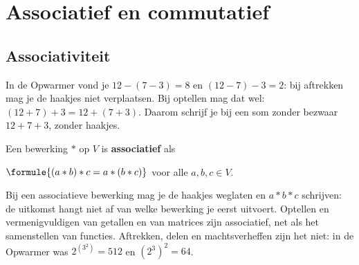 \begin{oefeningen}
\end{oefeningen}

\section{Associatief en commutatief}

\subsection{Associativiteit}

In de Opwarmer vond je $12 - (7 - 3) = 8$ en $(12 - 7) - 3 = 2$: bij aftrekken mag je de haakjes niet verplaatsen. Bij optellen mag dat wel: $(12 + 7) + 3 = 12 + (7 + 3)$. Daarom schrijf je bij een som zonder bezwaar $12 + 7 + 3$, zonder haakjes.

\begin{theorie}
Een bewerking $\ast$ op $V$ is \textbf{\textcolor{accent}{associatief}} als

\vspace{1mm}
\qquad $\formule{(a \ast b) \ast c = a \ast (b \ast c)}$ \qquad voor alle $a, b, c \in V$.
\end{theorie}

Bij een associatieve bewerking mag je de haakjes weglaten en $a \ast b \ast c$ schrijven: de uitkomst hangt niet af van welke bewerking je eerst uitvoert. Optellen en vermenigvuldigen van getallen en van matrices zijn associatief, net als het samenstellen van functies. Aftrekken, delen en machtsverheffen zijn het niet: in de Opwarmer was $2^{(3^2)} = 512$ en $(2^3)^2 = 64$.


